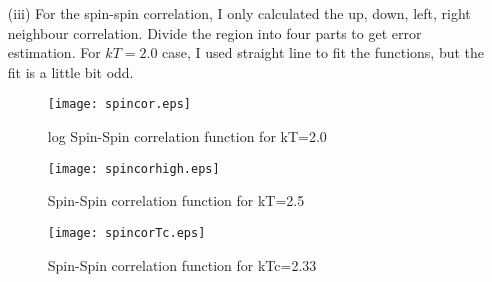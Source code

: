 \documentclass{article}
\begin{document}
\begin{enumerate}
\item[(iii)]
For the spin-spin correlation, I only calculated the up, down, left, right neighbour correlation.  Divide the region into four parts to get error estimation.
For $kT=2.0$ case, I used straight line to fit the functions, but the fit is a little bit odd.
 \begin{figure}[ht]
   \begin{center}
   {\texttt{[image: spincor.eps]}}
   \caption{log Spin-Spin correlation function for kT=2.0}
   \end{center}
  \end{figure}
  
 \begin{figure}[ht]
   \begin{center}
   {\texttt{[image: spincorhigh.eps]}}
   \caption{Spin-Spin correlation function for kT=2.5}
   \end{center}
  \end{figure}


 \begin{figure}[ht]
   \begin{center}
   {\texttt{[image: spincorTc.eps]}}
   \caption{Spin-Spin correlation function for kTc=2.33}
   \end{center}
  \end{figure}
\end{enumerate}
\newpage
\appendix
\end{document}
